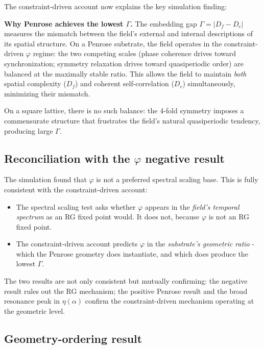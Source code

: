 \documentclass[11pt,a4paper]{article}
\theoremstyle{plain}
\theoremstyle{definition}
\newcommand{\phiGolden}{\varphi}
\begin{document}
The constraint-driven account now explains the key simulation finding:

\begin{keybox}
\textbf{Why Penrose achieves the lowest $\Gamma$.}
The embedding gap $\Gamma = |D_f - D_c|$ measures the mismatch between
the field's external and internal descriptions of its spatial structure.
On a Penrose substrate, the field operates in the constraint-driven
$\phiGolden$ regime: the two competing scales (phase coherence drives
toward synchronization; symmetry relaxation drives toward quasiperiodic
order) are balanced at the maximally stable ratio. This allows the
field to maintain \emph{both} spatial complexity ($D_f$) and coherent
self-correlation ($D_c$) simultaneously, minimizing their mismatch.

On a square lattice, there is no such balance: the 4-fold symmetry
imposes a commensurate structure that frustrates the field's natural
quasiperiodic tendency, producing large $\Gamma$.
\end{keybox}

\subsection{Reconciliation with the $\phiGolden$ negative result}

The simulation found that $\phiGolden$ is not a preferred spectral
scaling base. This is fully consistent with the constraint-driven account:

\begin{itemize}[noitemsep]
  \item The spectral scaling test asks whether $\phiGolden$ appears
    in the \emph{field's temporal spectrum} as an RG fixed point would.
    It does not, because $\phiGolden$ is not an RG fixed point.
  \item The constraint-driven account predicts $\phiGolden$ in the
    \emph{substrate's geometric ratio} - which the Penrose geometry
    does instantiate, and which does produce the lowest $\Gamma$.
\end{itemize}

The two results are not only consistent but mutually confirming:
the negative result rules out the RG mechanism; the positive Penrose
result and the broad resonance peak in $\eta(\alpha)$ confirm the
constraint-driven mechanism operating at the geometric level.

\subsection{Geometry-ordering result}
\end{document}

